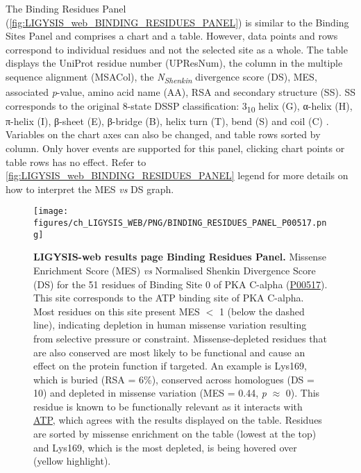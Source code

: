 The Binding Residues Panel (\autoref{fig:LIGYSIS_web_BINDING_RESIDUES_PANEL}) is similar to the Binding Sites Panel and comprises a chart and a table. However, data points and rows correspond to individual residues and not the selected site as a whole. The table displays the UniProt residue number (UPResNum), the column in the multiple sequence alignment (MSACol), the \textit{N\textsubscript{Shenkin}} divergence score (DS), MES, associated \textit{p}-value, amino acid name (AA), RSA and secondary structure (SS). SS corresponds to the original 8-state DSSP classification: 3\textsubscript{10} helix (G), α-helix (H), π-helix (I), β-sheet (E), β-bridge (B), helix turn (T), bend (S) and coil (C) \cite{KABSCH_1983_DSSP}. Variables on the chart axes can also be changed, and table rows sorted by column. Only hover events are supported for this panel, clicking chart points or table rows has no effect. Refer to \autoref{fig:LIGYSIS_web_BINDING_RESIDUES_PANEL} legend for more details on how to interpret the MES \textit{vs} DS graph.

\begin{figure}[htb!]
    \centering
    \texttt{[image: figures/ch\_LIGYSIS\_WEB/PNG/BINDING\_RESIDUES\_PANEL\_P00517.png]}
    \caption[LIGYSIS-web results page Binding Residues Panel]{\textbf{LIGYSIS-web results page Binding Residues Panel.} Missense Enrichment Score (MES) \textit{vs} Normalised Shenkin Divergence Score (DS) for the 51 residues of Binding Site 0 of PKA C-alpha (\href{https://www.uniprot.org/uniprotkb/P00517/entry}{P00517}). This site corresponds to the ATP binding site of PKA C-alpha. Most residues on this site present MES $<$ 1 (below the dashed line), indicating depletion in human missense variation resulting from selective pressure or constraint. Missense-depleted residues that are also conserved are most likely to be functional and cause an effect on the protein function if targeted. An example is Lys169, which is buried (RSA = 6\%), conserved across homologues (DS = 10) and depleted in missense variation (MES = 0.44, \textit{p} $\approx$ 0). This residue is known to be functionally relevant as it interacts with \href{https://www.ebi.ac.uk/pdbe-srv/pdbechem/chemicalCompound/show/ATP}{ATP}, which agrees with the results displayed on the table. Residues are sorted by missense enrichment on the table (lowest at the top) and Lys169, which is the most depleted, is being hovered over (yellow highlight).}
    \label{fig:LIGYSIS_web_BINDING_RESIDUES_PANEL}
\end{figure}

